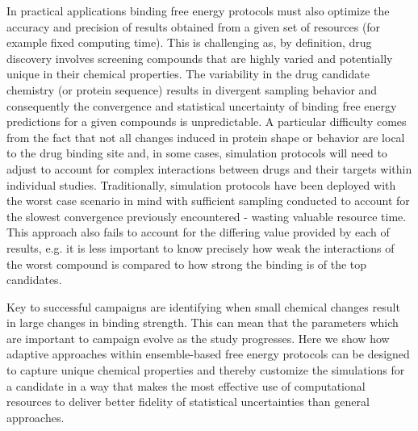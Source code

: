 In practical applications binding free energy protocols must also optimize the 
accuracy and precision of results obtained from a given set of resources (for 
example fixed computing time). This is challenging as, by definition, drug 
discovery involves screening compounds that are highly varied and potentially 
unique in their chemical properties. 
The variability in the drug candidate chemistry (or protein sequence) results 
in divergent sampling  behavior and consequently the convergence and statistical 
uncertainty of binding free energy predictions for a given compounds is 
unpredictable.
A particular difficulty comes from the fact that not all changes induced in 
protein shape or behavior are local to the drug binding site and, in 
some cases, simulation protocols will need to adjust to account for complex 
interactions between drugs and their targets within individual studies.
Traditionally, simulation protocols have been deployed with the worst case 
scenario in mind with sufficient sampling conducted to account for the 
slowest convergence previously encountered - wasting valuable resource time.
This approach also fails to account for the differing value provided by
each of results, e.g. it is less important to know precisely how weak 
the interactions of the worst compound is compared to how strong the binding 
is of the top candidates. 

Key to successful campaigns are identifying when small chemical changes result in 
large changes in binding strength. This can mean that the parameters which are 
important to campaign evolve as the study progresses.
Here we show how adaptive approaches within ensemble-based free energy 
protocols can be designed to capture unique chemical properties and thereby 
customize the simulations for a candidate in a way that makes the most 
effective use of computational resources to deliver better fidelity of 
statistical uncertainties than general approaches. 


